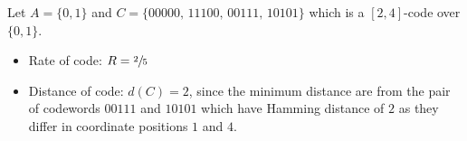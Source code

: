 \begin{exbox}
    \begin{example}
        Let $ A=\{0,1\} $ and $ C=\{00000,\,11100,\,00111,\,10101\} $ which is a
        $ [2,4] $-code over $ \{0,1\} $.
        \begin{itemize}
            \item Rate of code: $ R=\sfrac{2}{5} $
            \item Distance of code: $ d(C)=2 $, since the minimum distance
                  are from the pair of codewords $ 00111 $ and $ 10101 $ which
                  have Hamming distance of $ 2 $ as they differ in coordinate
                  positions $ 1 $ and $ 4 $.
        \end{itemize}
    \end{example}
\end{exbox}
